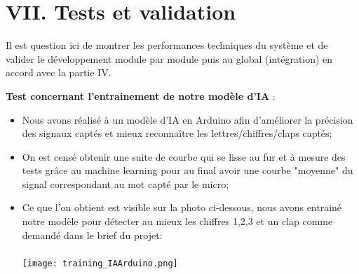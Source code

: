\documentclass[a4paper,11pt]{book}
\begin{document}
\newpage
\section*{VII. Tests et validation}

\vspace{2mm}
\noindent Il est question ici de montrer les performances techniques du système et de valider le développement module par module puis au global (intégration) en accord avec la partie IV.

\vspace{2mm}

\noindent \textbf{Test concernant l'entrainement de notre modèle d'IA} : 
\begin{itemize}
	\item Nous avons réalisé à un modèle d'IA en Arduino afin d'améliorer la précision des signaux captés et mieux reconnaître les lettres/chiffres/claps captés;
	\item On est censé obtenir une suite de courbe qui se lisse au fur et à mesure des tests grâce au machine learning pour au final avoir une courbe "moyenne" du signal correspondant au mot capté par le micro;
	\item Ce que l’on obtient est visible sur la photo ci-dessous, nous avons entrainé notre modèle pour détecter au mieux les chiffres 1,2,3 et un clap comme demandé dans le brief du projet: \\ \\
	\vspace{2mm}
	\texttt{[image: training\_IAArduino.png]}

\end{itemize}
\end{document}
